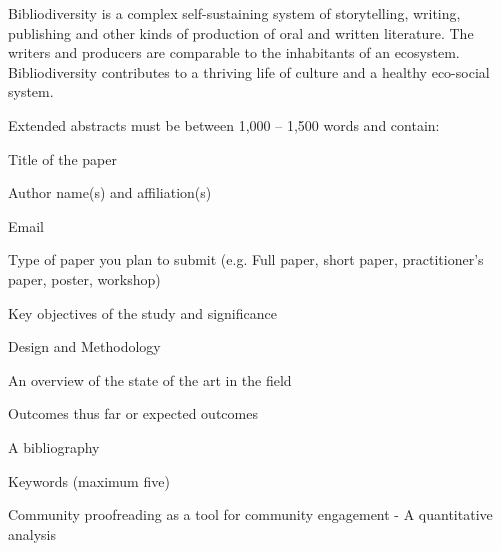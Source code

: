 Bibliodiversity is a complex self-sustaining system of storytelling, writing, publishing and other kinds of production of oral and written literature. The writers and producers are comparable to the inhabitants of an ecosystem. Bibliodiversity contributes to a thriving life of culture and a healthy eco-social system.

Extended abstracts must be between 1,000 – 1,500 words and contain:

    Title of the paper

    Author name(s) and affiliation(s)

    Email

    Type of paper you plan to submit (e.g. Full paper, short paper, practitioner’s paper, poster, workshop)

    Key objectives of the study and significance

    Design and Methodology

    An overview of the state of the art in the field

    Outcomes thus far or expected outcomes

    A bibliography

    Keywords (maximum five)


Community proofreading as a tool for community engagement - A quantitative analysis